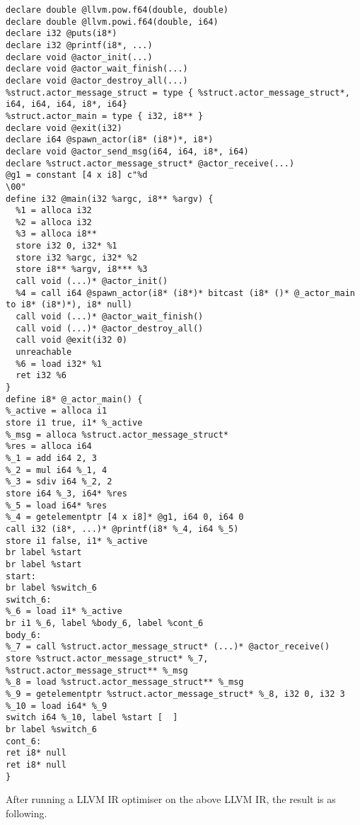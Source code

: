 \begin{lstlisting}[breaklines]
declare double @llvm.pow.f64(double, double)
declare double @llvm.powi.f64(double, i64)
declare i32 @puts(i8*)
declare i32 @printf(i8*, ...)
declare void @actor_init(...)
declare void @actor_wait_finish(...)
declare void @actor_destroy_all(...)
%struct.actor_message_struct = type { %struct.actor_message_struct*, i64, i64, i64, i8*, i64}
%struct.actor_main = type { i32, i8** }
declare void @exit(i32)
declare i64 @spawn_actor(i8* (i8*)*, i8*)
declare void @actor_send_msg(i64, i64, i8*, i64)
declare %struct.actor_message_struct* @actor_receive(...)
@g1 = constant [4 x i8] c"%d
\00"
define i32 @main(i32 %argc, i8** %argv) {
  %1 = alloca i32
  %2 = alloca i32
  %3 = alloca i8**
  store i32 0, i32* %1
  store i32 %argc, i32* %2
  store i8** %argv, i8*** %3
  call void (...)* @actor_init()
  %4 = call i64 @spawn_actor(i8* (i8*)* bitcast (i8* ()* @_actor_main to i8* (i8*)*), i8* null)
  call void (...)* @actor_wait_finish()
  call void (...)* @actor_destroy_all()
  call void @exit(i32 0)
  unreachable
  %6 = load i32* %1
  ret i32 %6
}
define i8* @_actor_main() {
%_active = alloca i1
store i1 true, i1* %_active
%_msg = alloca %struct.actor_message_struct*
%res = alloca i64
%_1 = add i64 2, 3
%_2 = mul i64 %_1, 4
%_3 = sdiv i64 %_2, 2
store i64 %_3, i64* %res
%_5 = load i64* %res
%_4 = getelementptr [4 x i8]* @g1, i64 0, i64 0
call i32 (i8*, ...)* @printf(i8* %_4, i64 %_5)
store i1 false, i1* %_active
br label %start
br label %start
start:
br label %switch_6
switch_6: 
%_6 = load i1* %_active
br i1 %_6, label %body_6, label %cont_6
body_6: 
%_7 = call %struct.actor_message_struct* (...)* @actor_receive()
store %struct.actor_message_struct* %_7, %struct.actor_message_struct** %_msg
%_8 = load %struct.actor_message_struct** %_msg
%_9 = getelementptr %struct.actor_message_struct* %_8, i32 0, i32 3
%_10 = load i64* %_9
switch i64 %_10, label %start [  ]
br label %switch_6
cont_6:
ret i8* null
ret i8* null
}
\end{lstlisting}

After running a LLVM IR optimiser on the above LLVM IR, the result is as following.

